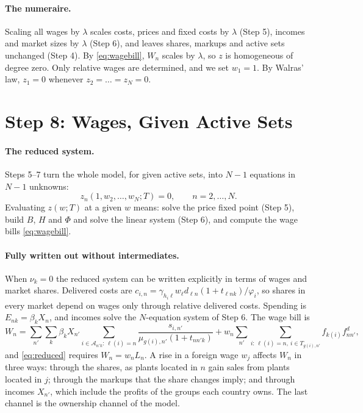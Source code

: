 \documentclass[11pt]{article}
\theoremstyle{remark}
\newcommand{\cA}{\mathcal A}
\begin{document}
\paragraph{The numeraire.} Scaling all wages by $\lambda$ scales costs, prices and fixed
costs by $\lambda$ (Step 5), incomes and market sizes by $\lambda$ (Step 6), and leaves
shares, markups and active sets unchanged (Step 4). By \eqref{eq:wagebill}, $W_n$ scales
by $\lambda$, so $z$ is homogeneous of degree zero. Only relative wages are determined,
and we set $w_1=1$. By Walras' law, $z_1=0$ whenever $z_2=\dots=z_N=0$.

\section{Step 8: Wages, Given Active Sets}
\label{sec:wages}

\paragraph{The reduced system.} Steps 5--7 turn the whole model, for given active sets,
into $N-1$ equations in $N-1$ unknowns:
\begin{equation}
  z_n(1,w_2,\dots,w_N;T)=0,\qquad n=2,\dots,N .
  \label{eq:reduced}
\end{equation}
Evaluating $z(w;T)$ at a given $w$ means: solve the price fixed point (Step 5), build
$B$, $H$ and $\Phi$ and solve the linear system (Step 6), and compute the wage bills
\eqref{eq:wagebill}.

\paragraph{Fully written out without intermediates.} When $\nu_k=0$ the reduced system
can be written explicitly in terms of wages and market shares. Delivered costs are
$c_{i,n}=\gamma_{h_i\ell}w_\ell d_{\ell n}(1+t_{\ell nk})/\varphi_i$, so shares in every
market depend on wages only through relative delivered costs. Spending is
$E_{nk}=\beta_kX_n$, and incomes solve the $N$-equation system of Step 6. The wage
bill is
\[
  W_n=\sum_{n'}\sum_k\beta_kX_{n'}
  \sum_{i\in\cA_{n'k}:\,\ell(i)=n}\frac{s_{i,n'}}{\mu_{g(i),n'}(1+t_{nn'k})}
  +w_n\sum_{n'}\sum_{i:\,\ell(i)=n,\ i\in T_{g(i),n'}}f_{k(i)}f^d_{nn'} ,
\]
and \eqref{eq:reduced} requires $W_n=w_nL_n$. A rise in a foreign wage $w_j$ affects
$W_n$ in three ways: through the shares, as plants located in $n$ gain sales from
plants located in $j$; through the markups that the share changes imply; and through
incomes $X_{n'}$, which include the profits of the groups each country owns. The last
channel is the ownership channel of the model.
\end{document}
